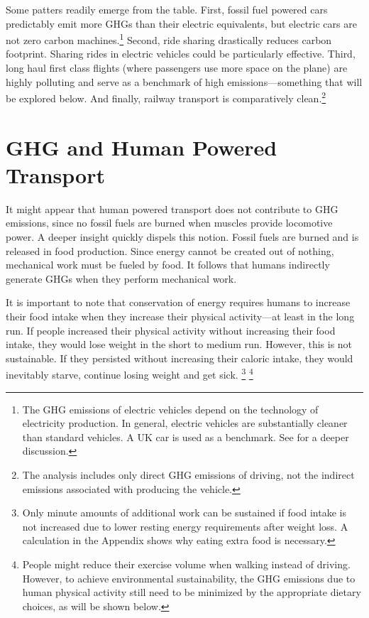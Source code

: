 \documentclass{article}[12pt,letterpaper]
\begin{document}
Some patters readily emerge from the table. First, fossil fuel powered cars predictably emit more GHGs than their electric equivalents, but electric cars are not zero carbon machines.\footnote{The GHG emissions of electric vehicles depend on the technology of electricity production. In general, electric vehicles are substantially cleaner than standard vehicles. A UK car is used as a benchmark. See \citet{holland2016} for a deeper discussion.} Second, ride sharing drastically reduces carbon footprint. Sharing rides in electric vehicles could be particularly effective. Third, long haul first class flights (where passengers use more space on the plane) are highly polluting and serve as a benchmark of high emissions---something that will be explored below. And finally, railway transport is comparatively clean.\footnote{The analysis includes only direct GHG emissions of driving, not the indirect emissions associated with producing the vehicle.}

\section{GHG and Human Powered Transport}
It might appear that human powered transport does not contribute to GHG emissions, since no fossil fuels are burned when muscles provide locomotive power. A deeper insight quickly dispels this notion. Fossil fuels are burned and \methane is released in food production. Since energy cannot be created out of nothing, mechanical work must be fueled by food. It follows that humans indirectly generate GHGs when they perform mechanical work.

It is important to note that conservation of energy requires humans to increase their food intake when they increase their physical activity---at least in the long run. If people increased their physical activity without increasing their food intake, they would lose weight in the short to medium run. However, this is not sustainable. If they persisted without increasing their caloric intake, they would inevitably starve, continue losing weight and get sick. \footnote{Only minute amounts of additional work can be sustained if food intake is not increased due to lower resting energy requirements after weight loss. A calculation in the Appendix shows why eating extra food is necessary.} \footnote{People might reduce their exercise volume when walking instead of driving. However, to achieve environmental sustainability, the GHG emissions due to human physical activity still need to be minimized by the appropriate dietary choices, as will be shown below.}
\end{document}
